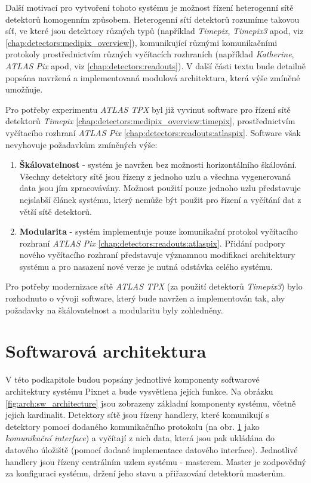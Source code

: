  Další motivací pro vytvoření tohoto systému je možnost řízení heterogenní sítě detektorů homogenním způsobem. Heterogenní sítí detektorů rozumíme takovou síť, ve které jsou detektory různých typů (například \textit{Timepix}, \textit{Timepix3} apod, viz \ref{chap:detectors:medipix_overview}), komunikující různými komunikačními protokoly prostřednictvím různých vyčítacích rozhraních (například \textit{Katherine}, \textit{ATLAS Pix} apod, viz \ref{chap:detectors:readouts}). V další části textu bude detailně popsána navržená a implementovaná modulová architektura, která výše zmíněné umožňuje.

 Pro potřeby experimentu \textit{ATLAS TPX} byl již vyvinut software \cite{atlastpx_sw,BegeraBcThesis2016} pro řízení sítě detektorů \textit{Timepix} \ref{chap:detectors:medipix_overview:timepix}, prostřednictvím vyčítacího rozhraní \textit{ATLAS Pix} \ref{chap:detectors:readouts:atlaspix}. Software však nevyhovuje požadavkům zmíněných výše:
 \begin{enumerate}[label=(\roman*)]
     \item \textbf{Škálovatelnost} - systém je navržen bez možnosti horizontálního škálování. Všechny detektory sítě jsou řízeny z jednoho uzlu a všechna vygenerovaná data jsou jím zpracovávány. Možnost použití pouze jednoho uzlu představuje nejslabší článek systému, který nemůže být použit pro řízení a vyčítání dat z větší sítě detektorů.
     \item \textbf{Modularita} - systém implementuje pouze komunikační protokol vyčítacího rozhraní \textit{ATLAS Pix} \ref{chap:detectors:readouts:atlaspix}. Přidání podpory nového vyčítacího rozhraní představuje významnou modifikaci architektury systému a pro nasazení nové verze je nutná odstávka celého systému.
 \end{enumerate}
Pro potřeby modernizace sítě \textit{ATLAS TPX} (za použití detektorů \textit{Timepix3}) bylo rozhodnuto o vývoji software, který bude navržen a implementován tak, aby požadavky na škálovatelnost a modularitu byly zohledněny.

\section{Softwarová architektura}\label{chap:arch:sw}
V této podkapitole budou popsány jednotlivé komponenty softwarové architektury systému Pixnet a bude vysvětlena jejich funkce. Na obrázku \ref{fig:arch:sw_architecture} jsou zobrazeny základní komponenty systému, včetně jejich kardinalit. Detektory sítě jsou řízeny handlery, které komunikují s detektory pomocí dodaného komunikačního protokolu (na obr. \ref{chap:arch:sw} jako \textit{komunikační interface}) a vyčítají z nich data, která jsou pak ukládána do datového úložiště (pomocí dodané implementace datového interface). Jednotlivé handlery jsou řízeny centrálním uzlem systému - masterem. Master je zodpovědný za konfiguraci systému, držení jeho stavu a přiřazování detektorů masterům.

